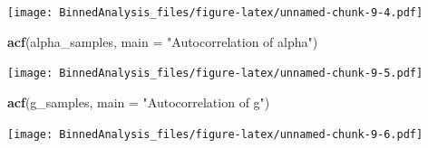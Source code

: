 \documentclass[
]{article}
\newenvironment{Shaded}{\begin{snugshade}}{\end{snugshade}}
\newcommand{\AttributeTok}[1]{\textcolor[rgb]{0.13,0.29,0.53}{#1}}
\newcommand{\FunctionTok}[1]{\textcolor[rgb]{0.13,0.29,0.53}{\textbf{#1}}}
\newcommand{\NormalTok}[1]{#1}
\newcommand{\StringTok}[1]{\textcolor[rgb]{0.31,0.60,0.02}{#1}}
\begin{document}
\texttt{[image: BinnedAnalysis\_files/figure-latex/unnamed-chunk-9-4.pdf]}

\begin{Shaded}
\begin{Highlighting}[]
\FunctionTok{acf}\NormalTok{(alpha\_samples, }\AttributeTok{main =} \StringTok{"Autocorrelation of alpha"}\NormalTok{)}
\end{Highlighting}
\end{Shaded}

\texttt{[image: BinnedAnalysis\_files/figure-latex/unnamed-chunk-9-5.pdf]}

\begin{Shaded}
\begin{Highlighting}[]
\FunctionTok{acf}\NormalTok{(g\_samples, }\AttributeTok{main =} \StringTok{"Autocorrelation of g"}\NormalTok{)}
\end{Highlighting}
\end{Shaded}

\texttt{[image: BinnedAnalysis\_files/figure-latex/unnamed-chunk-9-6.pdf]}
\end{document}
